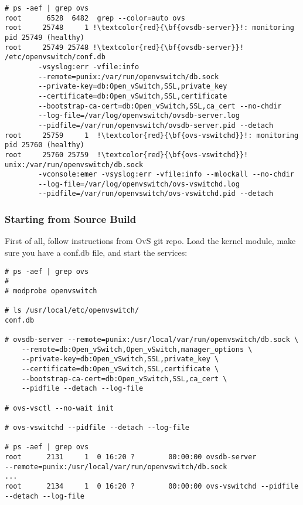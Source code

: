 \documentclass[letter]{article}
\begin{document}
{{\begin{appendices}
{\begin{lstlisting}[escapechar=!]
# ps -aef | grep ovs
root      6528  6482  grep --color=auto ovs
root     25748     1 !\textcolor{red}{\bf{ovsdb-server}}!: monitoring pid 25749 (healthy)
root     25749 25748 !\textcolor{red}{\bf{ovsdb-server}}! /etc/openvswitch/conf.db  
		-vsyslog:err -vfile:info 
		--remote=punix:/var/run/openvswitch/db.sock 
		--private-key=db:Open_vSwitch,SSL,private_key 
		--certificate=db:Open_vSwitch,SSL,certificate 
		--bootstrap-ca-cert=db:Open_vSwitch,SSL,ca_cert --no-chdir 
		--log-file=/var/log/openvswitch/ovsdb-server.log 
		--pidfile=/var/run/openvswitch/ovsdb-server.pid --detach
root     25759     1  !\textcolor{red}{\bf{ovs-vswitchd}}!: monitoring pid 25760 (healthy)
root     25760 25759  !\textcolor{red}{\bf{ovs-vswitchd}}! unix:/var/run/openvswitch/db.sock 
		-vconsole:emer -vsyslog:err -vfile:info --mlockall --no-chdir 
		--log-file=/var/log/openvswitch/ovs-vswitchd.log 
		--pidfile=/var/run/openvswitch/ovs-vswitchd.pid --detach 
\end{lstlisting}

\subsubsection{Starting from Source Build}
First of all, follow instructions from OvS git repo. Load the kernel module, make sure you have a conf.db file, and start the services:

\begin{lstlisting}
# ps -aef | grep ovs
#
# modprobe openvswitch

# ls /usr/local/etc/openvswitch/
conf.db

# ovsdb-server --remote=punix:/usr/local/var/run/openvswitch/db.sock \
    --remote=db:Open_vSwitch,Open_vSwitch,manager_options \
    --private-key=db:Open_vSwitch,SSL,private_key \
    --certificate=db:Open_vSwitch,SSL,certificate \
    --bootstrap-ca-cert=db:Open_vSwitch,SSL,ca_cert \
    --pidfile --detach --log-file

# ovs-vsctl --no-wait init

# ovs-vswitchd --pidfile --detach --log-file

# ps -aef | grep ovs
root      2131     1  0 16:20 ?        00:00:00 ovsdb-server 
--remote=punix:/usr/local/var/run/openvswitch/db.sock
...
root      2134     1  0 16:20 ?        00:00:00 ovs-vswitchd --pidfile 
--detach --log-file

\end{lstlisting}

}
\end{appendices}}}
\end{document}
